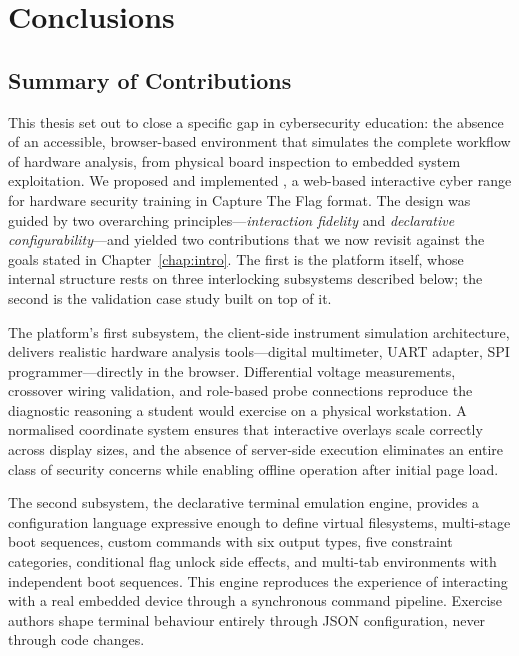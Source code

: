 \chapter{Conclusions}\label{chap:conclusions}

\section{Summary of Contributions}\label{sec:summary}

This thesis set out to close a specific gap in cybersecurity education: the absence of an accessible, browser-based environment that simulates the complete workflow of hardware analysis, from physical board inspection to embedded system exploitation. We proposed and implemented \pcbctf{}, a web-based interactive cyber range for hardware security training in Capture The Flag format. The design was guided by two overarching principles---\emph{interaction fidelity} and \emph{declarative configurability}---and yielded two contributions that we now revisit against the goals stated in Chapter~\ref{chap:intro}. The first is the \pcbctf{} platform itself, whose internal structure rests on three interlocking subsystems described below; the second is the validation case study built on top of it.

The platform's first subsystem, the client-side instrument simulation architecture, delivers realistic hardware analysis tools---digital multimeter, UART adapter, SPI programmer---directly in the browser. Differential voltage measurements, crossover wiring validation, and role-based probe connections reproduce the diagnostic reasoning a student would exercise on a physical workstation. A normalised coordinate system ensures that interactive overlays scale correctly across display sizes, and the absence of server-side execution eliminates an entire class of security concerns while enabling offline operation after initial page load.

The second subsystem, the declarative terminal emulation engine, provides a configuration language expressive enough to define virtual filesystems, multi-stage boot sequences, custom commands with six output types, five constraint categories, conditional flag unlock side effects, and multi-tab environments with independent boot sequences. This engine reproduces the experience of interacting with a real embedded device through a synchronous command pipeline. Exercise authors shape terminal behaviour entirely through JSON configuration, never through code changes.

